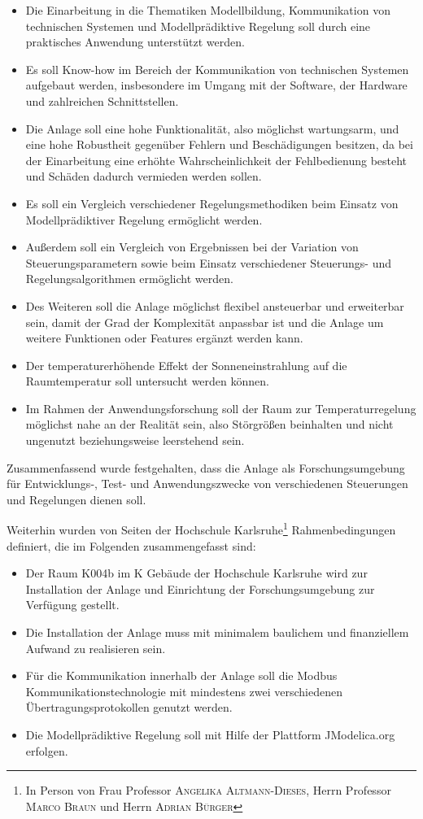 \begin{itemize}
	\item Die Einarbeitung in die Thematiken Modellbildung, Kommunikation von technischen Systemen und Modellprädiktive Regelung soll durch eine praktisches Anwendung unterstützt werden.
	\item Es soll Know-how im Bereich der Kommunikation von technischen Systemen aufgebaut werden, insbesondere im Umgang mit der Software, der Hardware und zahlreichen Schnittstellen.
	\item Die Anlage soll eine hohe Funktionalität, also möglichst wartungsarm, und eine hohe Robustheit gegenüber Fehlern und Beschädigungen besitzen, da bei der Einarbeitung eine erhöhte Wahrscheinlichkeit der Fehlbedienung besteht und Schäden dadurch vermieden werden sollen.
	\item Es soll ein Vergleich verschiedener Regelungsmethodiken beim Einsatz von Modellprädiktiver Regelung ermöglicht werden.
	\item Außerdem soll ein Vergleich von Ergebnissen bei der Variation von Steuerungsparametern sowie beim Einsatz verschiedener Steuerungs- und Regelungsalgorithmen ermöglicht werden.
	\item Des Weiteren soll die Anlage möglichst flexibel ansteuerbar und erweiterbar sein, damit der Grad der Komplexität anpassbar ist und die Anlage um weitere Funktionen oder Features ergänzt werden kann.
	\item Der temperaturerhöhende Effekt der Sonneneinstrahlung auf die Raumtemperatur soll untersucht werden können.
	\item Im Rahmen der Anwendungsforschung soll der Raum zur Temperaturregelung möglichst nahe an der Realität sein, also Störgrößen beinhalten und nicht ungenutzt beziehungsweise leerstehend sein.
\end{itemize}

Zusammenfassend wurde festgehalten, dass die Anlage als Forschungsumgebung für Entwicklungs-, Test- und Anwendungszwecke von verschiedenen Steuerungen und Regelungen dienen soll.

Weiterhin wurden von Seiten der Hochschule Karlsruhe\footnote{In Person von Frau Professor \textsc{Angelika Altmann-Dieses}, Herrn Professor \textsc{Marco Braun} und Herrn \textsc{Adrian Bürger}} Rahmenbedingungen definiert, die im Folgenden zusammengefasst sind:

\begin{itemize}
	\item Der Raum K004b im K Gebäude der Hochschule Karlsruhe wird zur Installation der Anlage und Einrichtung der Forschungsumgebung zur Verfügung gestellt.
	\item Die Installation der Anlage muss mit minimalem baulichem und finanziellem Aufwand zu realisieren sein.
	\item Für die Kommunikation innerhalb der Anlage soll die Modbus Kommunikationstechnologie mit mindestens zwei verschiedenen Übertragungsprotokollen genutzt werden.
	\item Die Modellprädiktive Regelung soll mit Hilfe der Plattform JModelica.org erfolgen.
\end{itemize}

